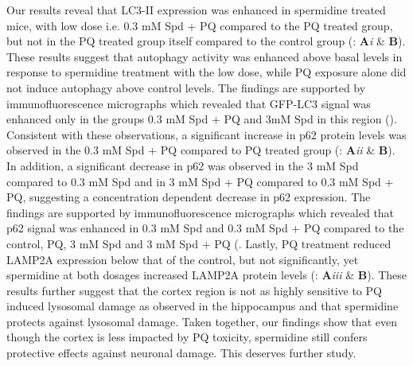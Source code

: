 Our results reveal that LC3-II expression was enhanced in spermidine treated mice, with low dose i.e. 0.3 mM Spd + PQ compared to the PQ treated group, but not in the PQ treated group itself compared to the control group (: \textbf{A}\textit{i} \& \textbf{B}). These results suggest that autophagy activity was enhanced above basal levels in response to spermidine treatment with the low dose, while PQ exposure alone did not induce autophagy above control levels. The findings are supported by immunofluorescence micrographs which revealed that GFP-LC3 signal was enhanced only in the groups 0.3 mM Spd + PQ and 3mM Spd in this region (). Consistent with these observations, a significant increase in p62 protein levels was observed in the 0.3 mM Spd + PQ compared to PQ treated group (: \textbf{A}\textit{ii} \& \textbf{B}). In addition, a significant decrease in p62 was observed in the 3 mM Spd compared to 0.3 mM Spd  and in 3 mM Spd + PQ compared to 0.3 mM Spd + PQ, suggesting a concentration dependent decrease in p62 expression. The findings are supported by immunofluorescence micrographs which revealed that p62 signal was enhanced in 0.3 mM Spd and 0.3 mM Spd + PQ compared to the control, PQ, 3 mM Spd and 3 mM Spd + PQ (. Lastly, PQ treatment reduced LAMP2A expression below that of the control, but not significantly, yet spermidine at both dosages increased LAMP2A protein levels (: \textbf{A}\textit{iii} \& \textbf{B}). These results further suggest that the cortex region is not as highly sensitive to PQ induced lysosomal damage as observed in the hippocampus and that spermidine protects against lysosomal damage. Taken together, our findings show that even though the cortex is less impacted by PQ toxicity, spermidine still confers protective effects against neuronal damage.  This deserves further study.